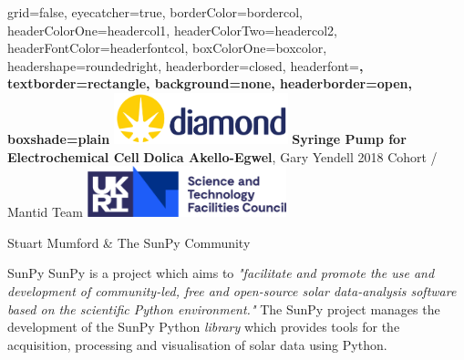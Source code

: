 \documentclass[a0paper,landscape]{baposter}
\begin{document}

\background{}

\begin{poster}{
	grid=false,
	eyecatcher=true, 
	borderColor=bordercol,
	headerColorOne=headercol1,
	headerColorTwo=headercol2,
	headerFontColor=headerfontcol,
	boxColorOne=boxcolor,
	headershape=roundedright,
	headerborder=closed,
	headerfont=\Large\sf\bf,
	textborder=rectangle,
	background=none,
	headerborder=open,
    boxshade=plain
}
{\includegraphics[height=4em]{images/diamondlogo}} %
{\bf Syringe Pump for Electrochemical Cell \vspace{0.5em}} %
{\textbf{Dolica Akello-Egwel}, Gary Yendell \hspace{12pt} 2018 Cohort / Mantid Team} %
{\includegraphics[height=4em]{images/stfclogo}} %

{
	\vspace{1em} Stuart Mumford \& The SunPy Community\\
}
{

}

\begin{posterbox}[name=introduction,column=0,row=0]{SunPy}
SunPy is a project which aims to \textit{"facilitate and promote the use and development of community-led, free and open-source solar data-analysis software based on the scientific Python environment."}
The SunPy project manages the development of the SunPy Python \textit{library} which provides tools for the acquisition, processing and visualisation of solar data using Python.
\end{posterbox}


\end{poster}
\end{document}
